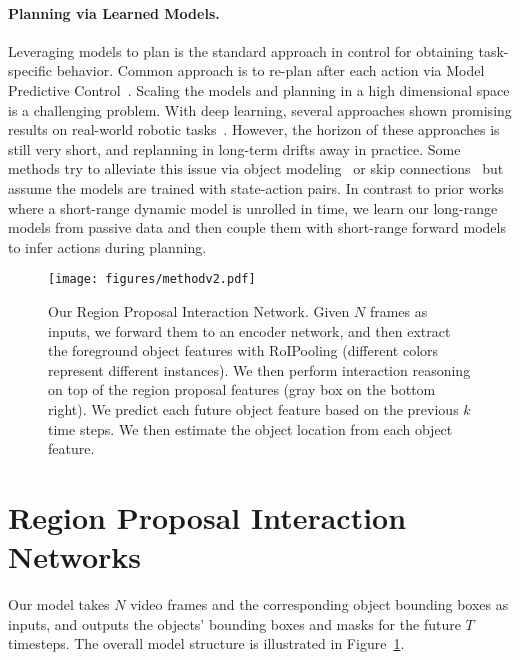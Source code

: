 \documentclass{article} \usepackage{iclr2021_conference,times}
\newcommand{\numinput}{N}
\newcommand{\numoutput}{T}
\begin{document}
\paragraph{Planning via Learned Models.}
Leveraging models to plan is the standard approach in control for obtaining task-specific behavior. Common approach is to re-plan after each action via Model Predictive Control~\citep{allgower2012nonlinear,camacho2013model,deisenroth2011pilco}. Scaling the models and planning in a high dimensional space is a challenging problem. With deep learning, several approaches shown promising results on real-world robotic tasks~\citep{finn2016unsupervised,finn2017deep,agrawal2016learning,pathak2018zero}. However, the horizon of these approaches is still very short, and replanning in long-term drifts away in practice. Some methods try to alleviate this issue via object modeling~\citep{janner2018reasoning,li2019propagation} or skip connections~\citep{ebert2018robustness} but assume the models are trained with state-action pairs. In contrast to prior works where a short-range dynamic model is unrolled in time, we learn our long-range models from passive data and then couple them with short-range forward models to infer actions during planning.

\begin{figure}[t]
{
\centering
\texttt{[image: figures/methodv2.pdf]}
\caption{Our Region Proposal Interaction Network. Given $N$ frames as inputs, we forward them to an encoder network, and then extract the foreground object features with RoIPooling (different colors represent different instances). We then perform interaction reasoning on top of the region proposal features (gray box on the bottom right). We predict each future object feature based on the previous $k$ time steps. We then estimate the object location from each object feature.}
\label{fig:method}
}
\vspace{-1.25em}
\end{figure}

\vspace{-0.75em}
\section{Region Proposal Interaction Networks}
\vspace{-0.75em}
Our model takes $\numinput$ video frames and the corresponding object bounding boxes as inputs, and outputs the objects' bounding boxes and masks for the future $\numoutput$ timesteps. The overall model structure is illustrated in Figure~\ref{fig:method}.
\end{document}
